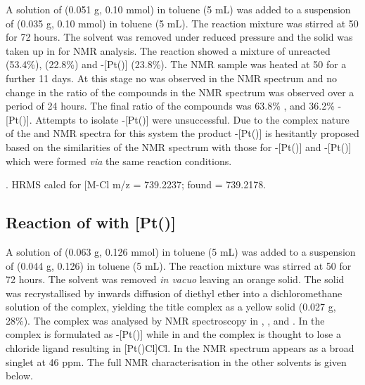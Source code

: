 A solution of \tBusixantphos{} (0.051 g, 0.10 mmol) in toluene (5 mL) was added to a suspension of \ce{[Pt(C6H10)Cl2]} (0.035 g, 0.10 mmol) in toluene (5 mL).  The reaction mixture was stirred at 50 \degC{} for 72 hours.  The solvent was removed under reduced pressure and the solid was taken up in  for NMR analysis.  The reaction showed a mixture of unreacted \tBusixantphos{} (53.4\%), \tBusixantphos {} (22.8\%) and \trans-[Pt(\tBusixantphos)] (23.8\%).  The NMR sample was heated at 50 \degC{} for a further 11 days.  At this stage no \ce{[Pt(C6H10)Cl2]} was observed in the \proton{} NMR spectrum and no change in the ratio of the compounds in the \phosphorus{} NMR spectrum was observed over a period of 24 hours.  The final ratio of the compounds was 63.8\% \tBusixantphos {}, and 36.2\% \trans-[Pt(\tBusixantphos)].  Attempts to isolate \trans-[Pt(\tBusixantphos)] were unsuccessful.  Due to the complex nature of the \proton{} and \carbon{} NMR spectra for this system the product \trans-[Pt(\tBusixantphos)] is hesitantly proposed based on the similarities of the \phosphorus{} NMR spectrum with those for \trans-[Pt(\tButhixantphos)] and \trans-[Pt(\tBuxantphos)] which were formed \emph{via} the same reaction conditions. 

\begin{sloppypar}
.
HRMS calcd for  [M-Cl\ce{]+} m/z = 739.2237; found = 739.2178.
\end{sloppypar}

\subsection*{Reaction of \tBuxantphos{} with [Pt()]}


A solution of \tBuxantphos{} (0.063 g, 0.126 mmol) in toluene (5 mL) was added to a suspension of \ce{[Pt(C6H10)Cl2]} (0.044 g, 0.126) in toluene (5 mL).  The reaction mixture was stirred at 50 \degC{} for 72 hours.  The solvent was removed \emph{in vacuo} leaving an orange solid.  The solid was recrystallised by inwards diffusion of diethyl ether into a dichloromethane solution of the complex, yielding the title complex as a yellow solid (0.027 g, 28\%).  The complex was analysed by NMR spectroscopy in , ,  and .  In  the complex is formulated as \trans-[Pt(\tBuxantphos)] while in  and  the complex is thought to lose a chloride ligand resulting in [Pt(\tBuxantphosk)Cl]Cl.  In  the \phosphorus{} NMR spectrum appears as a broad singlet at 46 ppm.  The full NMR characterisation in the other solvents is given below.  


